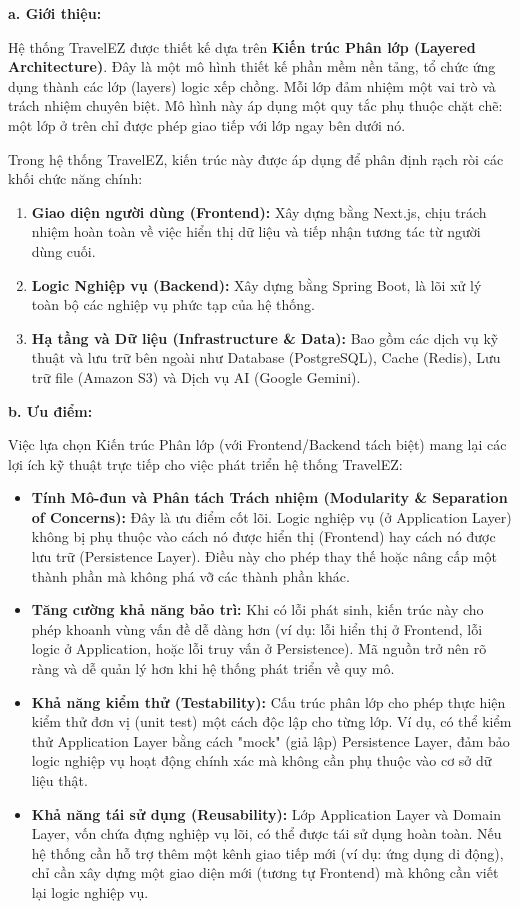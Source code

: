 
\noindent\textbf{a. Giới thiệu:}\par
Hệ thống TravelEZ được thiết kế dựa trên \textbf{Kiến trúc Phân lớp (Layered Architecture)}.
Đây là một mô hình thiết kế phần mềm nền tảng, tổ chức ứng dụng thành các lớp (layers) logic xếp chồng.
Mỗi lớp đảm nhiệm một vai trò và trách nhiệm chuyên biệt. Mô hình này áp dụng một quy tắc phụ thuộc chặt chẽ:
một lớp ở trên chỉ được phép giao tiếp với lớp ngay bên dưới nó.

Trong hệ thống TravelEZ, kiến trúc này được áp dụng để phân định rạch ròi các khối chức năng chính:
\begin{enumerate}
    \item \textbf{Giao diện người dùng (Frontend):} Xây dựng bằng Next.js, chịu trách nhiệm hoàn toàn về việc hiển thị dữ liệu và tiếp nhận tương tác từ người dùng cuối.
    \item \textbf{Logic Nghiệp vụ (Backend):} Xây dựng bằng Spring Boot, là lõi xử lý toàn bộ các nghiệp vụ phức tạp của hệ thống.
    \item \textbf{Hạ tầng và Dữ liệu (Infrastructure \& Data):} Bao gồm các dịch vụ kỹ thuật và lưu trữ bên ngoài như Database (PostgreSQL), Cache (Redis), Lưu trữ file (Amazon S3) và Dịch vụ AI (Google Gemini).
\end{enumerate}

\noindent\textbf{b. Ưu điểm:}\par
Việc lựa chọn Kiến trúc Phân lớp (với Frontend/Backend tách biệt) mang lại các lợi ích kỹ thuật trực tiếp cho việc phát triển hệ thống TravelEZ:
\begin{itemize}
    \item \textbf{Tính Mô-đun và Phân tách Trách nhiệm (Modularity \& Separation of Concerns):}
    Đây là ưu điểm cốt lõi. Logic nghiệp vụ (ở Application Layer) không bị phụ thuộc vào cách nó được hiển thị (Frontend)
    hay cách nó được lưu trữ (Persistence Layer). Điều này cho phép thay thế hoặc nâng cấp một thành phần mà không phá vỡ
    các thành phần khác.

    \item \textbf{Tăng cường khả năng bảo trì:}
    Khi có lỗi phát sinh, kiến trúc này cho phép khoanh vùng vấn đề dễ dàng hơn
    (ví dụ: lỗi hiển thị ở Frontend, lỗi logic ở Application, hoặc lỗi truy vấn ở Persistence).
    Mã nguồn trở nên rõ ràng và dễ quản lý hơn khi hệ thống phát triển về quy mô.

    \item \textbf{Khả năng kiểm thử (Testability):}
    Cấu trúc phân lớp cho phép thực hiện kiểm thử đơn vị (unit test) một cách độc lập cho từng lớp.
    Ví dụ, có thể kiểm thử Application Layer bằng cách "mock" (giả lập) Persistence Layer,
    đảm bảo logic nghiệp vụ hoạt động chính xác mà không cần phụ thuộc vào cơ sở dữ liệu thật.

    \item \textbf{Khả năng tái sử dụng (Reusability):}
    Lớp Application Layer và Domain Layer, vốn chứa đựng nghiệp vụ lõi, có thể được tái sử dụng hoàn toàn.
    Nếu hệ thống cần hỗ trợ thêm một kênh giao tiếp mới (ví dụ: ứng dụng di động),
    chỉ cần xây dựng một giao diện mới (tương tự Frontend) mà không cần viết lại logic nghiệp vụ.
\end{itemize}

